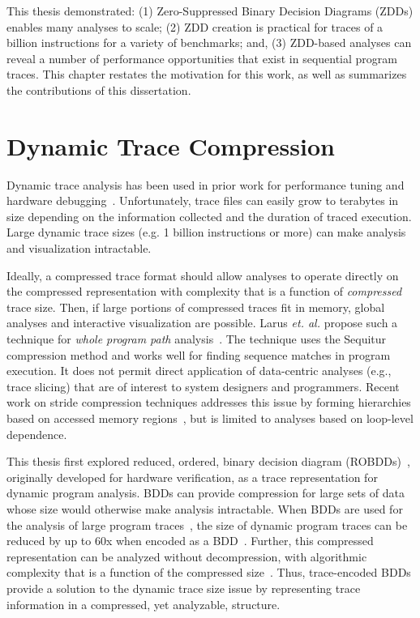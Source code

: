 \documentclass[defaultstyle,11pt]{thesis}
\begin{document}
This thesis demonstrated: (1) Zero-Suppressed Binary Decision Diagrams
(ZDDs) enables many analyses to scale; (2) ZDD creation is practical
for traces of a billion instructions for a variety of benchmarks; and,
(3) ZDD-based analyses can reveal a number of performance
opportunities that exist in sequential program traces.  This chapter
restates the motivation for this work, as well as summarizes the
contributions of this dissertation.

\section{Dynamic Trace Compression}

Dynamic trace analysis has been used in prior work for performance
tuning and hardware debugging~\cite{wu:94:micro}. Unfortunately, trace
files can easily grow to terabytes in size depending on the
information collected and the duration of traced execution.  Large
dynamic trace sizes (e.g. 1 billion instructions or more) can make
analysis and visualization intractable.

Ideally, a compressed trace format should allow analyses to operate
directly on the compressed representation with complexity that is a
function of \textit{compressed} trace size.  Then, if large portions of
compressed traces fit in memory, global analyses and interactive
visualization are possible.  Larus \textit{et. al.} propose such a
technique for \textit{whole program path} analysis~\cite{larus:99:pldi}.
The technique uses the Sequitur compression method and works well for
finding sequence matches in program execution.  It does not
permit direct application of data-centric analyses (e.g., trace
slicing) that are of interest to system designers and programmers.
Recent work on stride compression techniques addresses this issue by
forming hierarchies based on accessed memory
regions~\cite{minjang:10:micro}, but is limited to analyses based on
loop-level dependence.

This thesis first explored reduced, ordered, binary decision diagram
(ROBDDs)~\cite{bryant:86:ieeetc}, originally developed for hardware
verification, as a trace representation for dynamic program analysis.
BDDs can provide compression for large sets of data whose size would
otherwise make analysis intractable. When BDDs are used for the
analysis of large program
traces~\cite{price:06:cal,price:08:pact,zhang:04:icse}, the size of
dynamic program traces can be reduced by up to 60x when encoded as a
BDD~\cite{price:06:cal}.  Further, this compressed representation can
be analyzed without decompression, with algorithmic complexity that is
a function of the compressed size~\cite{price:06:cal}.  Thus,
trace-encoded BDDs provide a solution to the dynamic trace size issue
by representing trace information in a compressed, yet analyzable,
structure.
\end{document}
